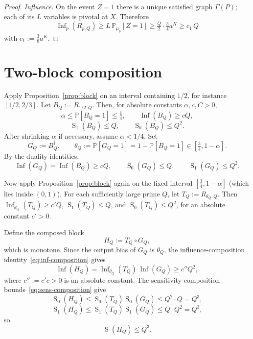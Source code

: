 \documentclass[11pt]{article}
\newcommand{\Prb}{\mathbb P}
\newcommand{\Inf}{\operatorname{Inf}}
\newcommand{\sens}{\operatorname{S}}
\begin{document}
\begin{proof}
\emph{Influence.} On the event \(Z=1\) there is a unique satisfied graph \(\Gamma(P)\); each of its \(L\) variables is pivotal at \(X\). Therefore
\[
    \Inf_p(R_{p,Q})\ge L\,\Prb_{\mu_p}[Z=1]\ge \tfrac{Q}{2}\cdot \tfrac34 a^K\ge c_1\,Q
\]
with \(c_1:=\tfrac38 a^K\).
\end{proof}

\section{Two-block composition}\label{sec:composition}

Apply Proposition~\ref{prop:block} on an interval containing \(1/2\), for instance \([1/2,2/3]\). Let \(B_Q:=R_{1/2,Q}\). Then, for absolute constants \(\alpha,c,C>0\),
\begin{equation}\label{eq:first-block}
    \alpha\le \Prb[B_Q=1]\le \tfrac14,
    \qquad
    \Inf(B_Q)\ge cQ,
\end{equation}
\begin{equation}\label{eq:first-block-sens}
    \sens_1(B_Q)\le Q,
    \qquad
    \sens_0(B_Q)\le Q^2.
\end{equation}
After shrinking \(\alpha\) if necessary, assume \(\alpha<1/4\). Set
\[
    G_Q:=B_Q^\dagger,
    \qquad
    \theta_Q:=\Prb[G_Q=1]=1-\Prb[B_Q=1]\in[\tfrac34,1-\alpha].
\]
By the duality identities,
\[
    \Inf(G_Q)=\Inf(B_Q)\ge cQ,
    \qquad
    \sens_0(G_Q)\le Q,
    \qquad
    \sens_1(G_Q)\le Q^2.
\]

Now apply Proposition~\ref{prop:block} again on the fixed interval \([\tfrac34,1-\alpha]\) (which lies inside \((0,1)\)). For each sufficiently large prime \(Q\), let \(T_Q:=R_{\theta_Q,Q}\). Then \(\Inf_{\theta_Q}(T_Q)\ge c'Q\), \(\sens_1(T_Q)\le Q\), and \(\sens_0(T_Q)\le Q^2\), for an absolute constant \(c'>0\).

Define the composed block
\[
    H_Q:=T_Q\circ G_Q,
\]
which is monotone. Since the output bias of \(G_Q\) is \(\theta_Q\), the influence-composition identity~\eqref{eq:inf-composition} gives
\begin{equation}\label{eq:H-influence}
    \Inf(H_Q)=\Inf_{\theta_Q}(T_Q)\,\Inf(G_Q)\ge c''Q^2,
\end{equation}
where \(c'':=c'c>0\) is an absolute constant. The sensitivity-composition bounds~\eqref{eq:sens-composition} give
\[
    \sens_0(H_Q)\le \sens_0(T_Q)\sens_0(G_Q)\le Q^2\cdot Q=Q^3,
\]
\[
    \sens_1(H_Q)\le \sens_1(T_Q)\sens_1(G_Q)\le Q\cdot Q^2=Q^3,
\]
so
\begin{equation}\label{eq:H-sens}
    \sens(H_Q)\le Q^3.
\end{equation}
\end{document}
